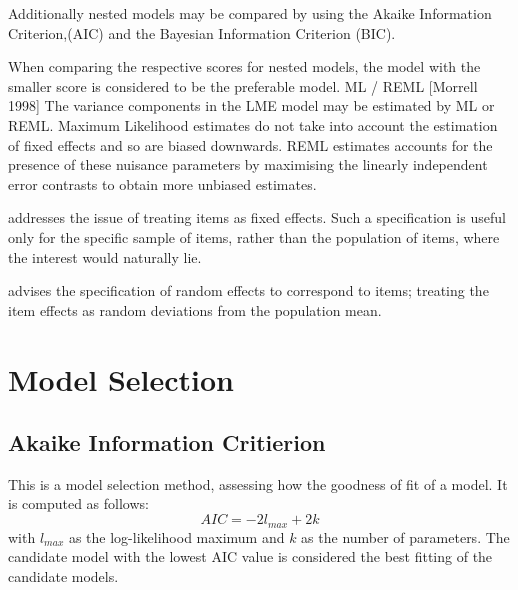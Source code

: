 \documentclass[12pt, a4paper]{report}
\theoremstyle{plain}
\theoremstyle{definition}
\theoremstyle{remark}
\begin{document}
Additionally nested models may be compared by using the Akaike Information Criterion,(AIC) and the Bayesian Information Criterion (BIC).

When comparing the respective scores for nested models, the model with the smaller score is considered to be the preferable model.
ML / REML
[Morrell 1998]
The variance components in the LME model may be estimated by ML or REML.
Maximum Likelihood estimates do not take into account the estimation of fixed effects and so
are biased downwards.
REML estimates accounts for the presence of these nuisance parameters by maximising the linearly independent error contrasts to obtain more unbiased estimates.

\citet{PB} addresses the issue of treating items as fixed effects. Such a specification is useful only for the specific sample of items, rather than the population of items, where the interest would naturally lie.

\citet{PB} advises the specification of random effects to correspond to items; treating the item effects as random deviations from the population mean.



%
%

\section{Model Selection}
\subsection{Akaike Information Critierion}
This is a model selection method, assessing how the goodness of
fit of a model. It is computed as follows:
\begin{displaymath}
AIC = -2l_{max}+ 2k
\end{displaymath}
with $l_{max}$ as the log-likelihood maximum and $k$ as the number
of parameters. The candidate model with the lowest AIC value is
considered the best fitting of the candidate models.
\end{document}
